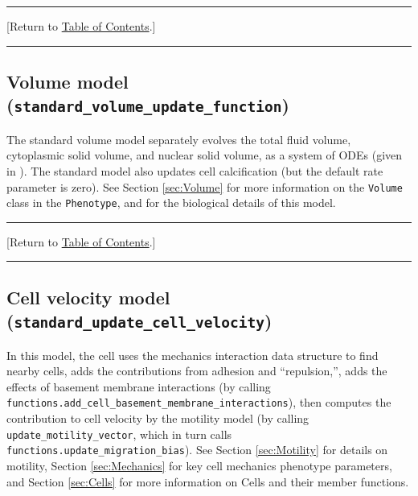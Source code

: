 \documentclass[12pt]{article}
\renewcommand{\v}{\verb}
\renewcommand{\tt}[1]{{\small \left[\texttt{#1}\right] }}
\newcommand{\TOClink}{\begin{center}\hrule\vskip-10pt\phantom{.}\hfill[Return to \hyperlink{TOC}{Table of Contents}.]\hfill\phantom{.}\vskip3pt\hrule\end{center}}
\begin{document}
\TOClink 

\subsection{Volume model (\texttt{standard\_volume\_update\_function})}
\label{sec:Standard_Models:Volume}
The standard volume model separately evolves the total fluid volume, 
cytoplasmic solid volume, and nuclear solid volume, as a system of ODEs 
(given in \cite{ref:PhysiCell}). The standard model also updates 
cell calcification (but the default rate parameter is zero). 
%
%
%
%
%
See Section \ref{sec:Volume} for more information on the \v|Volume| class 
in the \v|Phenotype|, and \cite{ref:PhysiCell} for the biological 
details of this model. 
\TOClink 

\subsection{Cell velocity model (\texttt{standard\_update\_cell\_velocity})}
\label{sec:Standard_Models:Velocity}
In this model, the cell uses the mechanics interaction 
data structure to find nearby cells, adds the contributions 
from adhesion and ``repulsion,'', adds the effects of 
basement membrane interactions 
(by calling \v|functions.add_cell_basement_membrane_interactions|), 
then computes the contribution to cell velocity by the motility 
model (by calling \v|update_motility_vector|, 
which in turn calls \\
\v|functions.update_migration_bias|). 
See Section \ref{sec:Motility} for details on motility,
Section \ref{sec:Mechanics} for key cell mechanics phenotype 
parameters, and Section \ref{sec:Cells} for more information 
on Cells and their member functions. 
\end{document}
